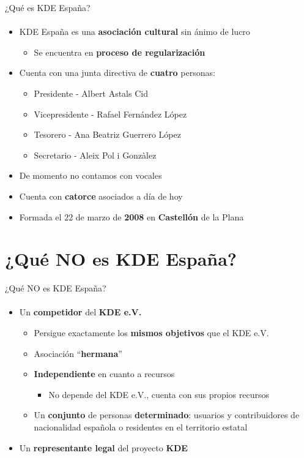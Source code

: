\documentclass[12pt]{beamer}
\begin{document}
\begin{frame}{¿Qué es KDE España?}
  \framesubtitle{}
  \begin{itemize}
    \item KDE España es una \textbf{asociación cultural} sin ánimo de lucro
    \begin{itemize}
      \item Se encuentra en \textbf{proceso de regularización}
    \end{itemize}
    \item Cuenta con una junta directiva de \textbf{cuatro} personas:
    \begin{itemize}
      \item Presidente - Albert Astals Cid
      \item Vicepresidente - Rafael Fernández López
      \item Tesorero - Ana Beatriz Guerrero López
      \item Secretario - Aleix Pol i Gonzàlez
    \end{itemize}
    \item De momento no contamos con vocales
    \item Cuenta con \textbf{catorce} asociados a día de hoy
    \item Formada el 22 de marzo de \textbf{2008} en \textbf{Castellón} de la Plana
  \end{itemize}
\end{frame}

\section{¿Qué NO es KDE España?}

\begin{frame}{¿Qué NO es KDE España?}
  \framesubtitle{}
  \begin{itemize}
    \item Un \textbf{competidor} del \textbf{KDE e.V.}
    \begin{itemize}
      \item Persigue exactamente los \textbf{mismos objetivos} que el KDE e.V.
      \item Asociación ``\textbf{hermana}''
      \item \textbf{Independiente} en cuanto a recursos
      \begin{itemize}
        \item No depende del KDE e.V., cuenta con sus propios recursos
      \end{itemize}
      \item Un \textbf{conjunto} de personas \textbf{determinado}: usuarios y
            contribuidores de nacionalidad española o residentes en el territorio estatal
    \end{itemize}
    \item Un \textbf{representante legal} del proyecto \textbf{KDE}
  \end{itemize}
\end{frame}
\end{document}

